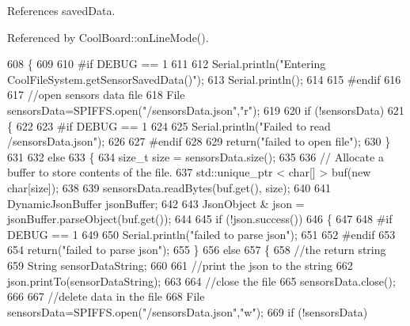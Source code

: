 References saved\+Data.



Referenced by Cool\+Board\+::on\+Line\+Mode().


\begin{DoxyCode}
608 \{
609 
610 \textcolor{preprocessor}{#if DEBUG == 1 }
611 
612     Serial.println(\textcolor{stringliteral}{"Entering CoolFileSystem.getSensorSavedData()"});
613     Serial.println();
614 
615 \textcolor{preprocessor}{#endif}
616 
617     \textcolor{comment}{//open sensors data file}
618     File sensorsData=SPIFFS.open(\textcolor{stringliteral}{"/sensorsData.json"},\textcolor{stringliteral}{"r"});
619     
620     \textcolor{keywordflow}{if} (!sensorsData)
621     \{
622 
623 \textcolor{preprocessor}{    #if DEBUG == 1 }
624 
625         Serial.println(\textcolor{stringliteral}{"Failed to read /sensorsData.json"});
626 
627 \textcolor{preprocessor}{    #endif}
628  
629         \textcolor{keywordflow}{return}(\textcolor{stringliteral}{"failed to open file"});
630     \}
631 
632     \textcolor{keywordflow}{else}
633     \{
634         \textcolor{keywordtype}{size\_t} size = sensorsData.size();
635 
636         \textcolor{comment}{// Allocate a buffer to store contents of the file.}
637         std::unique\_ptr < char[] > buf(\textcolor{keyword}{new} \textcolor{keywordtype}{char}[size]);
638 
639         sensorsData.readBytes(buf.get(), size);
640 
641         DynamicJsonBuffer jsonBuffer;
642 
643         JsonObject & json = jsonBuffer.parseObject(buf.get());
644         
645         \textcolor{keywordflow}{if} (!json.success())
646         \{
647 
648 \textcolor{preprocessor}{        #if DEBUG == 1}
649         
650             Serial.println(\textcolor{stringliteral}{"failed to parse json"});
651         
652 \textcolor{preprocessor}{        #endif}
653         
654             \textcolor{keywordflow}{return}(\textcolor{stringliteral}{"failed to parse json"});
655         \}
656         \textcolor{keywordflow}{else}
657         \{   
658             \textcolor{comment}{//the return string}
659             String sensorDataString;
660             
661             \textcolor{comment}{//print the json to the string}
662             json.printTo(sensorDataString);
663             
664             \textcolor{comment}{//close the file}
665             sensorsData.close();
666 
667             \textcolor{comment}{//delete data in the file}
668             File sensorsData=SPIFFS.open(\textcolor{stringliteral}{"/sensorsData.json"},\textcolor{stringliteral}{"w"});
669             \textcolor{keywordflow}{if} (!sensorsData)   

\end{DoxyCode}

